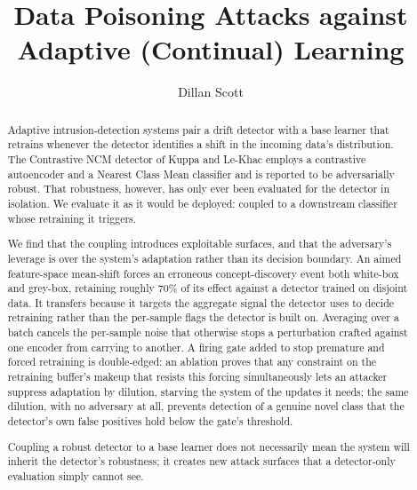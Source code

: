 \documentclass[a4paper, twoside]{report}
\title{Data Poisoning Attacks against Adaptive (Continual) Learning}
\author{Dillan Scott}
\theoremstyle{definition}
\begin{document}


\begin{abstract}
Adaptive intrusion-detection systems pair a drift detector with a base learner that retrains whenever the detector identifies a shift in the incoming data's distribution. The Contrastive NCM detector of Kuppa and Le-Khac employs a contrastive autoencoder and a Nearest Class Mean classifier and is reported to be adversarially robust. That robustness, however, has only ever been evaluated for the detector in isolation. We evaluate it as it would be deployed: coupled to a downstream classifier whose retraining it triggers.

We find that the coupling introduces exploitable surfaces, and that the adversary's leverage is over the system's adaptation rather than its decision boundary. An aimed feature-space mean-shift forces an erroneous concept-discovery event both white-box and grey-box, retaining roughly $70\%$ of its effect against a detector trained on disjoint data. It transfers because it targets the aggregate signal the detector uses to decide retraining rather than the per-sample flags the detector is built on. Averaging over a batch cancels the per-sample noise that otherwise stops a perturbation crafted against one encoder from carrying to another. A firing gate added to stop premature and forced retraining is double-edged: an ablation proves that any constraint on the retraining buffer's makeup that resists this forcing simultaneously lets an attacker suppress adaptation by dilution, starving the system of the updates it needs; the same dilution, with no adversary at all, prevents detection of a genuine novel class that the detector's own false positives hold below the gate's threshold.

Coupling a robust detector to a base learner does not necessarily mean the system will inherit the detector's robustness; it creates new attack surfaces that a detector-only evaluation simply cannot see.
\end{abstract}

\tableofcontents













\end{document}
